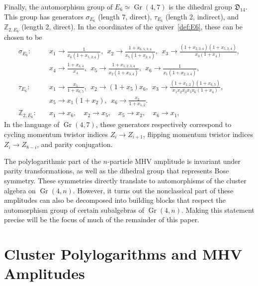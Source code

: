 \documentclass[12pt]{article}
\DeclareMathOperator{\Gr}{Gr}
\begin{document}
Finally, the automorphism group of $E_6 \simeq \Gr(4,7)$ is the dihedral group ${\mathfrak D}_{14}$. This group has generators $\sigma_{E_6}$ (length 7, direct), $\tau_{E_6}$ (length 2, indirect), and $\mathbb{Z}_{2,E_6}$ (length 2, direct). In the coordinates of the quiver~\eqref{def:E6}, these can be chosen to be 
\begin{align}
  \sigma_{E_6}:\quad 
    &x_1\to \frac{1}{x_6 (1+x_{5,3,4})},~~
    x_2\to \frac{1+x_{6,5,3,4}}{x_5 (1+x_{3,4})},~~
    x_3\to \frac{(1+x_{2,3,4}) (1+x_{5,3,4})}{x_3 (1+x_4)}, \nonumber \\
    &x_4\to \frac{1+x_{3,4}}{x_4},~~
    x_5\to \frac{1+x_{1,2,3,4}}{x_2 (1+x_{3,4})},~~
    x_6\to \frac{1}{x_1 (1+x_{2,3,4})},\nonumber \\[2ex]
  \tau_{E_6}:\quad
    &x_1\to \frac{x_5}{1+x_{6,5}},~~
    x_2\to (1+x_5) x_6,~~
    x_3\to \frac{(1+x_{1,2}) (1+x_{6,5})}{x_1 x_2 x_3 x_5 x_6 (1+x_4)},  \\
    &x_5\to x_1 (1+x_2),~~
    x_6\to \frac{x_2}{1+x_{1,2}}. \nonumber \\[2ex]
  \mathbb{Z}_{2,E_6}:\quad 
    &x_1\to x_6, \quad x_2\to x_5, \quad x_5\to x_2, \quad x_6\to x_1, \nonumber
\end{align}
In the language of $\Gr(4,7)$, these generators respectively correspond to cycling momentum twistor indices $Z_i \to Z_{i+1}$, flipping momentum twistor indices $Z_i \to Z_{8-i}$, and parity conjugation. 

The polylogarithmic part of the $n$-particle MHV amplitude is invariant under parity transformations, as well as the dihedral group that represents Bose symmetry. These symmetries directly translate to automorphisms of the cluster algebra on $\Gr(4,n)$. However, it turns out the nonclassical part of these amplitudes can also be decomposed into building blocks that respect the automorphism group of certain subalgebras of $\Gr(4,n)$. Making this statement precise will be the focus of much of the remainder of this paper. 

\section{Cluster Polylogarithms and MHV Amplitudes} \label{sec:cluster_polylog_MHV_review}
\end{document}
